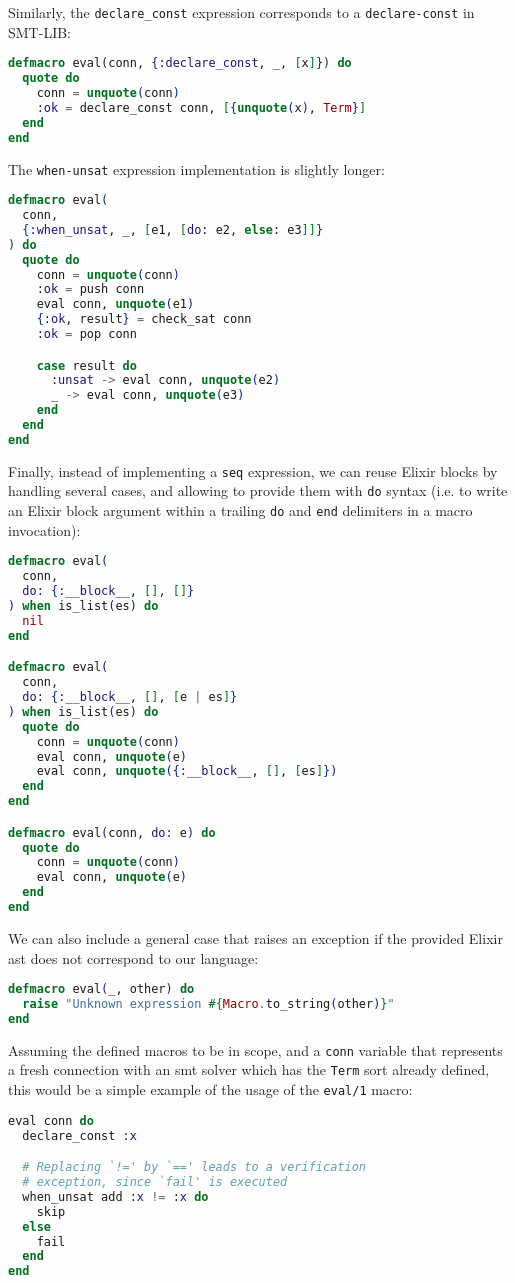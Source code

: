Similarly, the \verb|declare_const| expression corresponds to a
\verb|declare-const| in SMT-LIB:

\begin{lstlisting}[language=elixir,numbers=none,frame=none]
defmacro eval(conn, {:declare_const, _, [x]}) do
  quote do
    conn = unquote(conn)
    :ok = declare_const conn, [{unquote(x), Term}]
  end
end
\end{lstlisting}

The \verb|when-unsat| expression implementation is slightly longer:

\begin{lstlisting}[language=elixir,numbers=none,frame=none]
defmacro eval(
  conn, 
  {:when_unsat, _, [e1, [do: e2, else: e3]]}
) do
  quote do
    conn = unquote(conn)
    :ok = push conn
    eval conn, unquote(e1)
    {:ok, result} = check_sat conn
    :ok = pop conn

    case result do
      :unsat -> eval conn, unquote(e2)
      _ -> eval conn, unquote(e3)
    end
  end
end
\end{lstlisting}

Finally, instead of implementing a \verb|seq| expression, we can reuse Elixir
blocks by handling several cases, and allowing to provide them with \verb|do|
syntax (i.e. to write an Elixir block argument within a trailing \verb|do| and
\verb|end| delimiters in a macro invocation):

\begin{lstlisting}[language=elixir,numbers=none,frame=none]
defmacro eval(
  conn, 
  do: {:__block__, [], []}
) when is_list(es) do
  nil
end

defmacro eval(
  conn, 
  do: {:__block__, [], [e | es]}
) when is_list(es) do
  quote do
    conn = unquote(conn)
    eval conn, unquote(e)
    eval conn, unquote({:__block__, [], [es]})
  end
end

defmacro eval(conn, do: e) do
  quote do
    conn = unquote(conn)
    eval conn, unquote(e)
  end
end
\end{lstlisting}

We can also include a general case that raises an exception if the provided
Elixir \gls{ast} does not correspond to our language:

\begin{lstlisting}[language=elixir,numbers=none,frame=none]
defmacro eval(_, other) do
  raise "Unknown expression #{Macro.to_string(other)}"
end
\end{lstlisting}

Assuming the defined macros to be in scope, and a \verb|conn| variable that
represents a fresh connection with an \acrshort{smt} solver which has the
\verb|Term| sort already defined, this would be a simple example of the usage of
the \verb|eval/1| macro:

\begin{lstlisting}[language=elixir,numbers=none,frame=none]
eval conn do
  declare_const :x

  # Replacing `!=' by `==' leads to a verification
  # exception, since `fail' is executed
  when_unsat add :x != :x do
    skip
  else
    fail
  end
end
\end{lstlisting}

